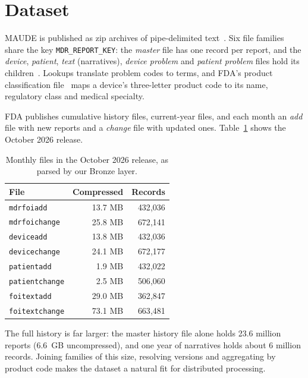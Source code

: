 \section{Dataset}
\label{sec:dataset}

MAUDE is published as zip archives of pipe-delimited text~\cite{fda-mdr-files}. Six file
families share the key \texttt{MDR\_REPORT\_KEY}: the \emph{master} file has one record per
report, and the \emph{device}, \emph{patient}, \emph{text} (narratives), \emph{device problem}
and \emph{patient problem} files hold its children~\cite{ensign2017primer}. Lookups translate
problem codes to terms, and FDA's product classification file~\cite{fda-classification} maps a
device's three-letter product code to its name, regulatory class and medical specialty.

FDA publishes cumulative history files, current-year files, and each month an \emph{add} file
with new reports and a \emph{change} file with updated ones.
Table~\ref{tab:volumes} shows the October 2026 release.

\begin{table}[t]
  \caption{Monthly files in the October 2026 release, as parsed by our Bronze layer.}
  \label{tab:volumes}
  \begin{tabular}{lrr}
    \toprule
    File & Compressed & Records \\
    \midrule
    \texttt{mdrfoiadd}     & 13.7 MB & 432{,}036 \\
    \texttt{mdrfoichange}  & 25.8 MB & 672{,}141 \\
    \texttt{deviceadd}     & 13.8 MB & 432{,}036 \\
    \texttt{devicechange}  & 24.1 MB & 672{,}177 \\
    \texttt{patientadd}    &  1.9 MB & 432{,}022 \\
    \texttt{patientchange} &  2.5 MB & 506{,}060 \\
    \texttt{foitextadd}    & 29.0 MB & 362{,}847 \\
    \texttt{foitextchange} & 73.1 MB & 663{,}481 \\
    \bottomrule
  \end{tabular}
\end{table}

The full history is far larger: the master history file alone holds 23.6 million reports
(6.6~GB uncompressed), and one year of narratives holds about 6 million records. Joining
families of this size, resolving versions and aggregating by product code makes the dataset a
natural fit for distributed processing.

